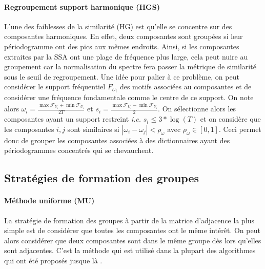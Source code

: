 \documentclass{gretsi}
\newcommand{\inter}{\left[0, 1\right]}
\begin{document}
\paragraph{Regroupement support harmonique (HGS)}\label{par:HGS}
    L'une des faiblesses de la similarité (HG) est qu'elle se concentre sur des composantes harmoniques. En effet, deux composantes sont groupées si leur périodogramme ont des pics aux mêmes endroits. Ainsi, si les composantes extraites par la SSA ont une plage de fréquence plus large, cela peut nuire au groupement car la normalisation du spectre fera passer la métrique de similarité sous le seuil de regroupement.
    Une idée pour palier à ce problème, on peut considérer le support fréquentiel $F_{U_i}$ des motifs associées au composantes et de considérer une fréquence fondamentale comme le centre de ce support. On note alors $\omega_i = \frac{\displaystyle\max \mathcal F_{U_i} + \min \mathcal F_{U_i} }{2 T}$ et $s_i = \frac{\displaystyle\max \mathcal F_{U_i} - \min \mathcal F_{U_i} }{2}$. On sélectionne alors les composantes ayant un support restreint \emph{i.e.} $s_i \le 3*\log(T)$ et on considère que les composantes $i, j$ sont similaires si $|\omega_i - \omega_j| < \rho_\omega$ avec $\rho_\omega \in \inter$.
    Ceci permet donc de grouper les composantes associées à des dictionnaires ayant des périodogrammes concentrés qui se chevauchent.



\subsection{Stratégies de formation des groupes}
\label{sub:clust}
\paragraph{Méthode uniforme (MU)}
La stratégie de formation des groupes à partir de la matrice d'adjacence la plus simple est de considérer que toutes les composantes ont le même intérêt. On peut alors considérer que deux composantes sont dans le même groupe dès lors qu'elles sont adjacentes. C'est la méthode qui est utilisé dans la plupart des algorithmes qui ont été proposés jusque là \cite{abalov_14_auto, alvarez_13_auto}.\\

\end{document}
